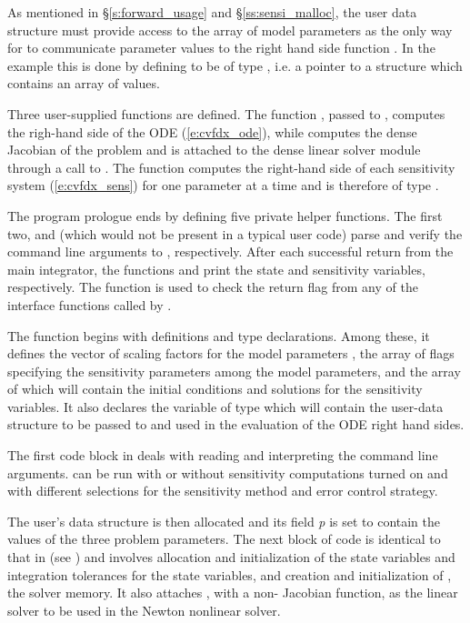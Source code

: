 As mentioned in \S\ref{s:forward_usage} and \S\ref{ss:sensi_malloc}, the user data
structure  must provide access to the array of model parameters 
as the only way for {\cvodes} to communicate parameter values to the right hand side 
function . In the  example this is done by defining  to be 
of type , i.e. a pointer to a structure which contains an array of 
  values.

Three user-supplied functions are defined. The function , passed to
, computes the righ-hand side of the ODE (\ref{e:cvfdx_ode}), while
 computes the dense Jacobian of the problem and is attached to the
dense linear solver module {\cvdense} through a call to .
The function  computes the right-hand side of each sensitivity system
(\ref{e:cvfdx_sens}) for one parameter at a time and is therefore of type
.

The program prologue ends by defining five private helper functions. 
The first two,  and  (which would not be present in 
a typical user code) parse and verify the command line arguments to , respectively.
After each successful return from the main {\cvodes} integrator, the functions 
 and  print the state and sensitivity variables,
respectively. 
The function  is used to check the return flag from any of the
{\cvodes} interface functions called by .

The  function begins with definitions and type declarations. 
Among these, it defines the vector  of  scaling factors for
the model parameters , the array  of  flags specifying
the sensitivity parameters among the model parameters, and the array  of 
 which will contain the initial conditions and solutions for the sensitivity
variables. It also declares the variable  of type  
which will contain the user-data structure to be passed to {\cvodes} and used in the 
evaluation of the ODE right hand sides.

The first code block in  deals with reading and interpreting the
command line arguments.  can be run with or without sensitivity computations
turned on and with different selections for the sensitivity method and error control strategy.

The user's data structure is then allocated and its field {\em p} is set to contain
the values of the three problem parameters.
The next block of code is identical to that in  (see \cite{cvode2.2.0_ex})
and involves allocation and initialization of the state variables and integration 
tolerances for the state variables, and creation and initialization of , 
the {\cvodes} solver memory. 
It also attaches {\cvdense}, with a non- Jacobian function, as the linear solver 
to be used in the Newton nonlinear solver.

